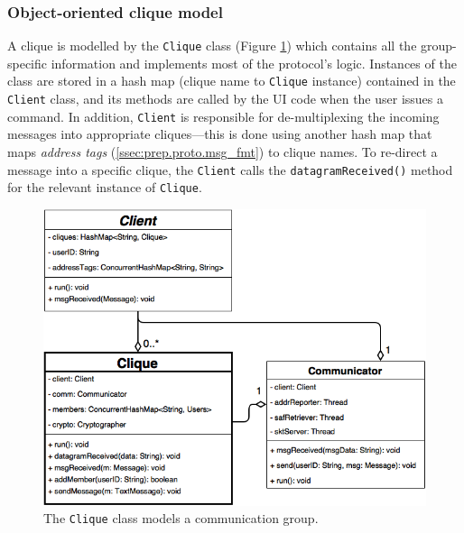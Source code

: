 \documentclass[a4paper, twoside, 12pt]{report}
\begin{document}
\subsubsection{Object-oriented clique model}
A clique is modelled by the \texttt{Clique} class (Figure \ref{fig:clique_uml}) which contains all the group-specific information and implements most of the protocol's logic. Instances of the class are stored in a hash map (clique name to \texttt{Clique} instance) contained in the \texttt{Client} class, and its methods are called by the UI code when the user issues a command. In addition, \texttt{Client} is responsible for de-multiplexing the incoming messages into appropriate cliques---this is done using another hash map that maps \emph{address tags} (\cref{ssec:prep.proto.msg_fmt}) to clique names. To re-direct a message into a specific clique, the \texttt{Client} calls the \texttt{datagramReceived()} method for the relevant instance of \texttt{Clique}.
\begin{figure}[H]
    \centering
    \includegraphics[width=0.8\linewidth]{pics/clique_uml.png}
    \caption{\label{fig:clique_uml} The \texttt{Clique} class models a communication group.}
\end{figure}
\end{document}
